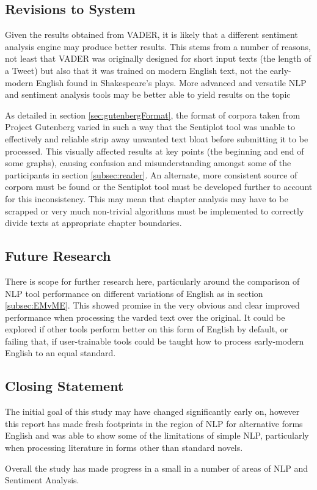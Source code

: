 \documentclass{article}
\begin{document}
    \subsection{Revisions to System}
        Given the results obtained from VADER, it is likely that a different sentiment analysis engine may produce better results. This stems from a number of reasons, not least that VADER was originally designed for short input texts (the length of a Tweet) but also that it was trained on modern English text, not the early-modern English found in Shakespeare's plays. More advanced and versatile NLP and sentiment analysis tools may be better able to yield results on the topic

        As detailed in section \ref{sec:gutenbergFormat}, the format of corpora taken from Project Gutenberg varied in such a way that the Sentiplot tool was unable to effectively and reliable strip away unwanted text bloat before submitting it to be processed. This visually affected results at key points (the beginning and end of some graphs), causing confusion and misunderstanding amongst some of the participants in section \ref{subsec:reader}. An alternate, more consistent source of corpora must be found or the Sentiplot tool must be developed further to account for this inconsistency. This may mean that chapter analysis may have to be scrapped or very much non-trivial algorithms must be implemented to correctly divide texts at appropriate chapter boundaries.
    \subsection{Future Research}
        There is scope for further research here, particularly around the comparison of NLP tool performance on different variations of English as in section \ref{subsec:EMvME}. This showed promise in the very obvious and clear improved performance when processing the varded text over the original. It could be explored if other tools perform better on this form of English by default, or failing that, if user-trainable tools could be taught how to process early-modern English to an equal standard.
    \subsection{Closing Statement}
        The initial goal of this study may have changed significantly early on, however this report has made fresh footprints in the region of NLP for alternative forms English and was able to show some of the limitations of simple NLP, particularly when processing literature in forms other than standard novels.
        
        Overall the study has made progress in a small in a number of areas of NLP and Sentiment Analysis.
\label{sec:conclusion}
\newpage


\end{document}
